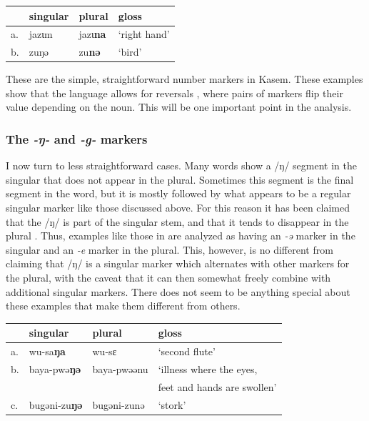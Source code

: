 \begin{exe}
    \ex \label{nepl-kasem}
    \begin{tabular}[t]{llll}
      & singular & plural & gloss        \\
      \midrule
      a. & jazɩm    & jazɩ\textbf{na} & `right hand' \\
      b. & zuŋə     & zu\textbf{nə}   & `bird'       \\
    \end{tabular}
\end{exe}

These are the simple, straightforward number markers in Kasem. These examples show that the language allows for reversals \autocite{Baerman.2007}, where pairs of markers flip their value depending on the noun. This will be one important point in the analysis.

\subsubsection{The \textit{-ŋ-} and \textit{-g-} markers}

I now turn to less straightforward cases. Many words show a /ŋ/ segment in the singular that does not appear in the plural. Sometimes this segment is the final segment in the word, but it is mostly followed by what appears to be a regular singular marker like those discussed above. For this reason it has been claimed that the /ŋ/ is part of the singular stem, and that it tends to disappear in the plural \autocites{Callow.1965, Awedoba.1980}. Thus, examples like those in   are analyzed as having an \textit{-ə} marker in the singular and an \textit{-e} marker in the plural. This, however, is no different from claiming that /ŋ/ is a singular marker which alternates with other markers for the plural, with the caveat that it can then somewhat freely combine with additional singular markers. There does not seem to be anything special about these examples that make them different from others.

\begin{exe}
    \ex \label{delete-ng}
    \begin{tabular}[t]{llll}
         & singular             & plural      & gloss                         \\
      \midrule
      a. & wu-sa\textbf{ŋa}     & wu-sɛ       & `second flute'                \\
      b. & baya-pwə\textbf{ŋə}  & baya-pwəənu & `illness where the eyes,       \\
         &                      &             &  feet and hands are swollen' \\
      c. & bugəni-zu\textbf{ŋə} & bugəni-zunə & `stork'                       \\
    \end{tabular}
\end{exe}

